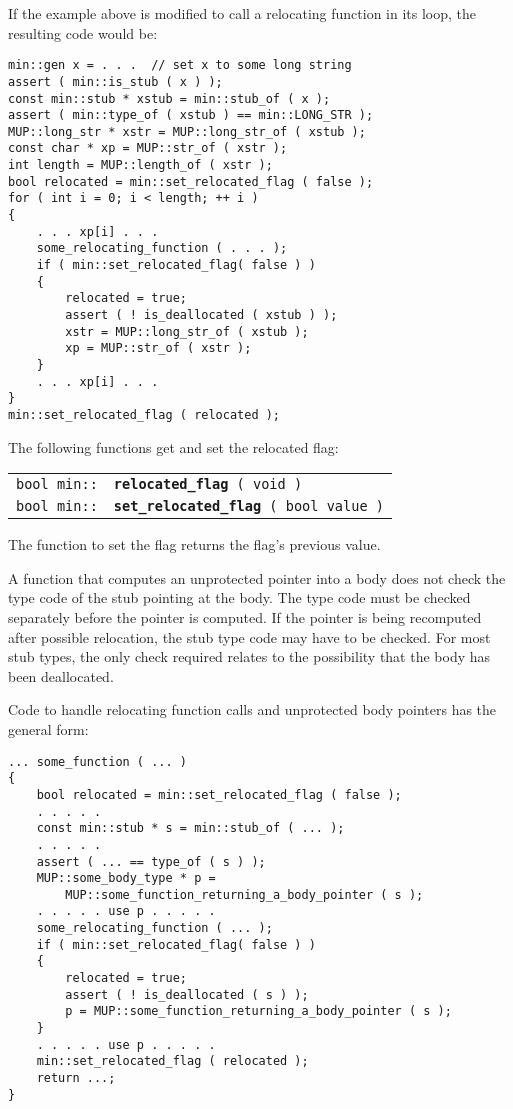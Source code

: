 \documentclass[12pt]{article}
\makeatletter
\newcommand{\ttindex}[1]{\index{#1@{\tt #1}}}
\newcommand{\minindex}[1]{\ttindex{min::#1}\ttindex{#1}}
\newenvironment{indpar}[1][0.3in]%
	{\begin{list}{}%
		     {\setlength{\itemsep}{0in}%
		      \setlength{\topsep}{0in}%
		      \setlength{\parsep}{1ex}%
		      \setlength{\labelwidth}{#1}%
		      \setlength{\leftmargin}{#1}%
		      \addtolength{\leftmargin}{\labelsep}}%
	 \item}%
	{\end{list}}
\newcommand{\LABEL}[1]{\label{#1}}
\newcommand{\MINKEY}[1]{{\tt \bf #1}\minindex{#1}}
\makeatother
\begin{document}
If the example above is modified to call a relocating function
in its loop, the resulting code would be:
\begin{indpar}\begin{verbatim}
min::gen x = . . .  // set x to some long string
assert ( min::is_stub ( x ) );
const min::stub * xstub = min::stub_of ( x );
assert ( min::type_of ( xstub ) == min::LONG_STR );
MUP::long_str * xstr = MUP::long_str_of ( xstub );
const char * xp = MUP::str_of ( xstr );
int length = MUP::length_of ( xstr );
bool relocated = min::set_relocated_flag ( false );
for ( int i = 0; i < length; ++ i )
{
    . . . xp[i] . . .
    some_relocating_function ( . . . );
    if ( min::set_relocated_flag( false ) )
    {
        relocated = true;
        assert ( ! is_deallocated ( xstub ) );
        xstr = MUP::long_str_of ( xstub );
        xp = MUP::str_of ( xstr );
    }
    . . . xp[i] . . .
}
min::set_relocated_flag ( relocated );
\end{verbatim}\end{indpar}

The following functions get and set the relocated flag:

\begin{indpar}\begin{tabular}{r@{}l}
\verb|bool min::| & \MINKEY{relocated\_flag}\verb| ( void )|
\LABEL{MIN::RELOCATED_FLAG} \\
\verb|bool min::| & \MINKEY{set\_relocated\_flag}\verb| ( bool value )|
\LABEL{MIN::SET_RELOCATED_FLAG}
\end{tabular}\end{indpar}

The function to set the flag returns the flag's previous value.

A function that computes an unprotected pointer into a body does not
check the type code of the stub pointing at the body.  The type
code must be checked separately before the pointer is computed.  If the
pointer is being recomputed after possible relocation, the stub type
code may have to be checked.  For most stub types, the only check
required relates to the possibility that the body has been deallocated.

Code to handle relocating function calls and unprotected body
pointers has the general form:

\begin{indpar}\begin{verbatim}
... some_function ( ... )
{
    bool relocated = min::set_relocated_flag ( false );
    . . . . .
    const min::stub * s = min::stub_of ( ... );
    . . . . .
    assert ( ... == type_of ( s ) );
    MUP::some_body_type * p =
        MUP::some_function_returning_a_body_pointer ( s );
    . . . . . use p . . . . .
    some_relocating_function ( ... );
    if ( min::set_relocated_flag( false ) )
    {
        relocated = true;
        assert ( ! is_deallocated ( s ) );
        p = MUP::some_function_returning_a_body_pointer ( s );
    }
    . . . . . use p . . . . .
    min::set_relocated_flag ( relocated );
    return ...;
}
\end{verbatim}\end{indpar}
\end{document}
